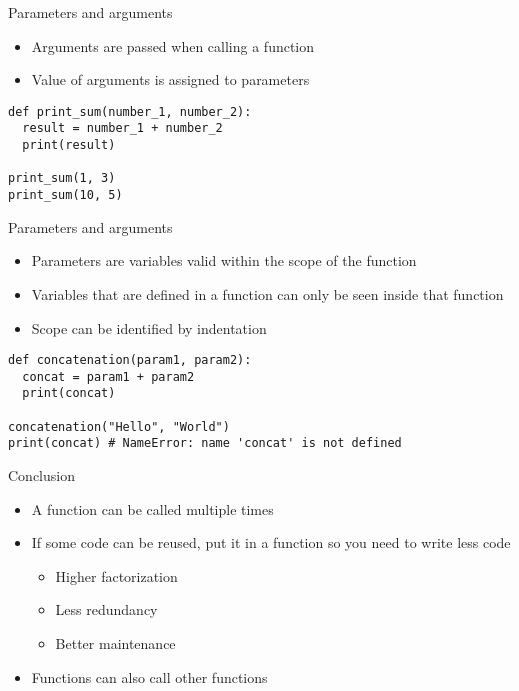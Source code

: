 \documentclass[10pt, a4paper]{beamer} %
\begin{document}
\begin{frame}
	\framebreak
	\begin{block}{Parameters and arguments}
		\begin{itemize}
			\item Arguments are passed when calling a function
			\item Value of arguments is assigned to parameters
		\end{itemize}
		\begin{lstlisting}
def print_sum(number_1, number_2):
  result = number_1 + number_2
  print(result)

print_sum(1, 3)
print_sum(10, 5)
  \end{lstlisting}
	\end{block}
	\begin{block}{Parameters and arguments}
		\framebreak
		\begin{itemize}
			\item Parameters are variables valid within the scope of the function
			\item Variables that are defined in a function can only be seen inside that function
			\item Scope can be identified by indentation
		\end{itemize}
		\begin{lstlisting}
def concatenation(param1, param2):
  concat = param1 + param2
  print(concat)

concatenation("Hello", "World")
print(concat) # NameError: name 'concat' is not defined
  \end{lstlisting}
	\end{block}
	\begin{block}{Conclusion}
		\begin{itemize}
			\item A function can be called multiple times
			\item If some code can be reused, put it in a function so you need to write less code
			      \begin{itemize}
				      \item Higher factorization
				      \item Less redundancy
				      \item Better maintenance
			      \end{itemize}
			\item Functions can also call other functions
		\end{itemize}
	\end{block}
\end{frame}
\end{document}
